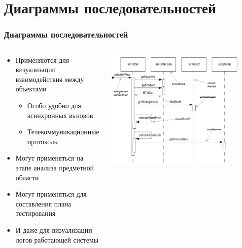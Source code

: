 \documentclass{../mcsslides}
\begin{document}
    \section{Диаграммы последовательностей}

    \begin{frame}
        \frametitle{Диаграммы последовательностей}
        \begin{columns}
            \begin{column}{0.5\textwidth}
                \begin{itemize}
                    \item Применяются для визуализации взаимодействия между объектами
                    \begin{itemize}
                        \item Особо удобно для асинхронных вызовов
                        \item Телекоммуникационные протоколы
                    \end{itemize}
                    \item Могут применяться на этапе анализа предметной области
                    \item Могут применяться для составления плана тестирования
                    \item И даже для визуализации логов работающей системы
                \end{itemize}
            \end{column}
            \begin{column}{0.5\textwidth}
                \begin{center}
                    \includegraphics[width=0.9\textwidth]{sequenceDiagramSyntax.png}
                \end{center}
            \end{column}
        \end{columns}
    \end{frame}
\end{document}
